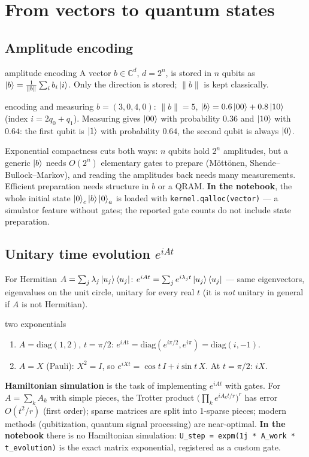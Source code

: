 \documentclass[11pt,a4paper,openany]{book}
\newcounter{wex}[chapter]
\newenvironment{steps}{\begin{enumerate}[label=\textbf{Step \arabic*.}, leftmargin=4.2em, itemsep=2pt]}{\end{enumerate}}
\begin{document}
\section{From vectors to quantum states}
\subsection{Amplitude encoding}
\begin{defn}{amplitude encoding}
A vector $b\in\mathbb C^d$, $d = 2^{n}$, is stored in $n$ qubits as $\ket b = \frac{1}{\|b\|}\sum_ib_i\ket i$. Only the direction is stored; $\|b\|$ is kept classically.
\end{defn}
\begin{wexample}{encoding and measuring}
$b = (3, 0, 4, 0)$: $\|b\| = 5$, $\ket b = 0.6\ket{00} + 0.8\ket{10}$ (index $i = 2q_0 + q_1$). Measuring gives $\ket{00}$ with probability $0.36$ and $\ket{10}$ with $0.64$:
the first qubit is $\ket1$ with probability $0.64$, the second qubit is always $\ket0$.
\end{wexample}
Exponential compactness cuts both ways: $n$ qubits hold $2^n$ amplitudes, but a generic $\ket b$ needs $O(2^n)$ elementary gates to prepare (Möttönen,
Shende--Bullock--Markov), and reading the amplitudes back needs many measurements. Efficient preparation needs structure in $b$ or a QRAM.
\textbf{In the notebook}, the whole initial state $\ket0_c\ket b\ket0_a$ is loaded with \texttt{kernel.qalloc(vector)} --- a simulator feature without gates;
the reported gate counts do not include state preparation.

\subsection{Unitary time evolution $e^{iAt}$}
For Hermitian $A = \sum_j\lambda_j\ket{u_j}\bra{u_j}$: $e^{iAt} = \sum_je^{i\lambda_jt}\ket{u_j}\bra{u_j}$ --- same eigenvectors, eigenvalues on the unit circle,
unitary for every real $t$ (it is \emph{not} unitary in general if $A$ is not Hermitian).
\begin{wexample}{two exponentials}
\begin{steps}
\item $A = \mathrm{diag}(1, 2)$, $t = \pi/2$: $e^{iAt} = \mathrm{diag}(e^{i\pi/2}, e^{i\pi}) = \mathrm{diag}(i, -1)$.
\item $A = X$ (Pauli): $X^2 = I$, so $e^{iXt} = \cos t\,I + i\sin t\,X$. At $t = \pi/2$: $iX$.
\end{steps}
\end{wexample}
\textbf{Hamiltonian simulation} is the task of implementing $e^{iAt}$ with gates. For $A = \sum_kA_k$ with simple pieces, the Trotter product
$\big(\prod_ke^{iA_kt/r}\big)^r$ has error $O(t^2/r)$ (first order); sparse matrices are split into 1-sparse pieces; modern methods (qubitization, quantum signal
processing) are near-optimal. \textbf{In the notebook} there is no Hamiltonian simulation: \texttt{U\_step = expm(1j * A\_work * t\_evolution)} is the exact
matrix exponential, registered as a custom gate.
\end{document}
